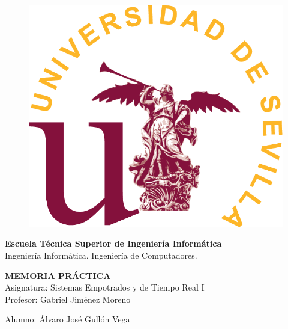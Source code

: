 \documentclass[11pt,a4paper]{article}
\begin{document}
	\begin{titlepage}
		\begin{center}
			\begin{figure}
				\centering
				\includegraphics[scale=0.2]{US-marca-principal.png}
			\end{figure}
			{\large \textbf{Escuela Técnica Superior de Ingeniería Informática}}
			\vspace{2mm}\\
			{Ingeniería Informática. Ingeniería de Computadores.}
			\vspace{60mm}\\
			\begin{center}
				{\huge \textbf{MEMORIA PRÁCTICA \uppercase\expandafter{\relax}}}\\[2mm]
				{Asignatura: Sistemas Empotrados y de Tiempo Real I}\\
				{Profesor: Gabriel Jiménez Moreno}
			\end{center}
			\vfill
			{Alumno: Álvaro José Gullón Vega}
		\end{center}
	\end{titlepage}
	\pagebreak
	\tableofcontents
	\pagebreak
	
\end{document}
